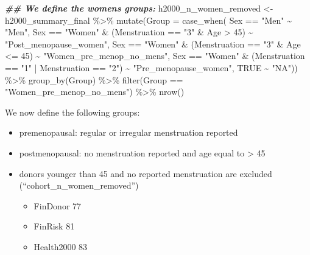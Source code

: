 \documentclass[
]{article}
\newenvironment{Shaded}{\begin{snugshade}}{\end{snugshade}}
\newcommand{\AttributeTok}[1]{\textcolor[rgb]{0.77,0.63,0.00}{#1}}
\newcommand{\ConstantTok}[1]{\textcolor[rgb]{0.00,0.00,0.00}{#1}}
\newcommand{\DecValTok}[1]{\textcolor[rgb]{0.00,0.00,0.81}{#1}}
\newcommand{\DocumentationTok}[1]{\textcolor[rgb]{0.56,0.35,0.01}{\textbf{\textit{#1}}}}
\newcommand{\FunctionTok}[1]{\textcolor[rgb]{0.00,0.00,0.00}{#1}}
\newcommand{\NormalTok}[1]{#1}
\newcommand{\OtherTok}[1]{\textcolor[rgb]{0.56,0.35,0.01}{#1}}
\newcommand{\SpecialCharTok}[1]{\textcolor[rgb]{0.00,0.00,0.00}{#1}}
\newcommand{\StringTok}[1]{\textcolor[rgb]{0.31,0.60,0.02}{#1}}
\providecommand{\tightlist}{%
  \setlength{\itemsep}{0pt}\setlength{\parskip}{0pt}}
\begin{document}
\begin{Shaded}
\begin{Highlighting}[]
\DocumentationTok{\#\# We define the women\textquotesingle{}s groups:}
\NormalTok{h2000\_n\_women\_removed }\OtherTok{\textless{}{-}}\NormalTok{ h2000\_summary\_final }\SpecialCharTok{\%\textgreater{}\%}
  \FunctionTok{mutate}\NormalTok{(}\AttributeTok{Group =} \FunctionTok{case\_when}\NormalTok{(}
\NormalTok{    Sex }\SpecialCharTok{==} \StringTok{"Men"} \SpecialCharTok{\textasciitilde{}} \StringTok{"Men"}\NormalTok{,}
\NormalTok{    Sex }\SpecialCharTok{==} \StringTok{"Women"} \SpecialCharTok{\&}\NormalTok{ (Menstruation }\SpecialCharTok{==} \StringTok{"3"} \SpecialCharTok{\&}\NormalTok{ Age }\SpecialCharTok{\textgreater{}} \DecValTok{45}\NormalTok{) }\SpecialCharTok{\textasciitilde{}} \StringTok{"Post\_menopause\_women"}\NormalTok{,}
\NormalTok{    Sex }\SpecialCharTok{==} \StringTok{"Women"} \SpecialCharTok{\&}\NormalTok{ (Menstruation }\SpecialCharTok{==} \StringTok{"3"} \SpecialCharTok{\&}\NormalTok{ Age }\SpecialCharTok{\textless{}=} \DecValTok{45}\NormalTok{) }\SpecialCharTok{\textasciitilde{}} \StringTok{"Women\_pre\_menop\_no\_mens"}\NormalTok{,}
\NormalTok{    Sex }\SpecialCharTok{==} \StringTok{"Women"} \SpecialCharTok{\&}\NormalTok{ (Menstruation }\SpecialCharTok{==} \StringTok{"1"} \SpecialCharTok{|}\NormalTok{ Menstruation }\SpecialCharTok{==} \StringTok{"2"}\NormalTok{) }\SpecialCharTok{\textasciitilde{}} \StringTok{"Pre\_menopause\_women"}\NormalTok{,}
    \ConstantTok{TRUE} \SpecialCharTok{\textasciitilde{}} \StringTok{"NA"}\NormalTok{)) }\SpecialCharTok{\%\textgreater{}\%}
  \FunctionTok{group\_by}\NormalTok{(Group) }\SpecialCharTok{\%\textgreater{}\%}
  \FunctionTok{filter}\NormalTok{(Group }\SpecialCharTok{==}  \StringTok{"Women\_pre\_menop\_no\_mens"}\NormalTok{) }\SpecialCharTok{\%\textgreater{}\%}
  \FunctionTok{nrow}\NormalTok{()}
\end{Highlighting}
\end{Shaded}

We now define the following groups:

\begin{itemize}
\tightlist
\item
  premenopausal: regular or irregular menstruation reported
\item
  postmenopausal: no menstruation reported and age equal to
  \textgreater{} 45
\item
  donors younger than 45 and no reported menstruation are excluded
  (``cohort\_n\_women\_removed'')

  \begin{itemize}
  \tightlist
  \item
    FinDonor 77
  \item
    FinRisk 81
  \item
    Health2000 83
  \end{itemize}
\end{itemize}
\end{document}
